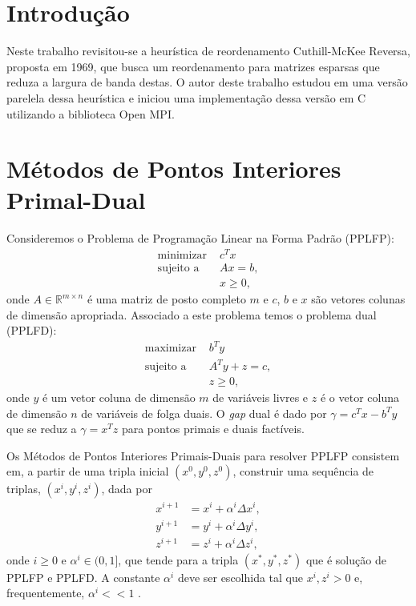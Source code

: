 \section{Introdução}
Neste trabalho revisitou-se a heurística de reordenamento Cuthill-McKee Reversa,
proposta em 1969, que busca um reordenamento para matrizes esparsas que reduza a
largura de banda destas. O autor deste trabalho estudou em uma versão parelela
dessa heurística e iniciou uma implementação dessa versão em C utilizando a
biblioteca Open MPI.

\section{Métodos de Pontos Interiores Primal-Dual}
Consideremos o Problema de Programação Linear na Forma Padrão (PPLFP):
\begin{align*}
    \text{minimizar } & c^T x \\
    \text{sujeito a } & A x = b, \\
    & x \geq 0,
\end{align*}
onde $A \in \mathbb{R}^{m \times n}$ é uma matriz de posto completo $m$ e $c$,
$b$ e $x$ são vetores colunas de dimensão apropriada. Associado a este problema
temos o problema dual (PPLFD):
\begin{align*}
    \text{maximizar } & b^T y \\
    \text{sujeito a } & A^T y + z = c, \\
    & z \geq 0,
\end{align*}
onde $y$ é um vetor coluna de dimensão $m$ de variáveis livres e $z$ é o vetor
coluna de dimensão $n$ de variáveis de folga duais. O \textit{gap} dual é dado
por $\gamma = c^T x - b^T y$ que se reduz a $\gamma = x^T z$ para pontos primais
e duais factíveis.

Os Métodos de Pontos Interiores Primais-Duais para resolver PPLFP consistem em, a
partir de uma tripla inicial $(x^0, y^0, z^0)$, construir uma
sequência de triplas, $(x^i, y^i, z^i)$, dada por
\begin{align*}
    x^{i + 1} &= x^i + \alpha^i \Delta x^i, \\
    y^{i + 1} &= y^i + \alpha^i \Delta y^i, \\
    z^{i + 1} &= z^i + \alpha^i \Delta z^i,
\end{align*}
onde $i \geq 0$ e $\alpha^i \in (0, 1]$, que tende para a tripla $(x^*, y^*, z^*)$ que é
solução de PPLFP e PPLFD. A constante $\alpha^i$ deve ser escolhida tal que $x^i,
z^i > 0$ e, frequentemente, $\alpha^i << 1$ \cite{Wright:1987:PrimalDualIP}.

